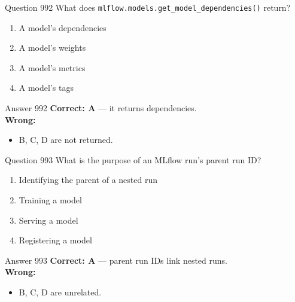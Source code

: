 \documentclass[aspectratio=169,11pt]{beamer}
\begin{document}
	\begin{frame}{Question 992}
		What does \texttt{mlflow.models.get\_model\_dependencies()} return?
		\begin{enumerate}[label=\Alph*.]
			\item A model's dependencies
			\item A model's weights
			\item A model's metrics
			\item A model's tags
		\end{enumerate}
	\end{frame}
	\begin{frame}{Answer 992}
		\textbf{Correct: A} --- it returns dependencies.\\
		\vspace{0.5em}
		\textbf{Wrong:}
		\begin{itemize}
			\item B, C, D are not returned.
		\end{itemize}
	\end{frame}
	
	\begin{frame}{Question 993}
		What is the purpose of an MLflow run's parent run ID?
		\begin{enumerate}[label=\Alph*.]
			\item Identifying the parent of a nested run
			\item Training a model
			\item Serving a model
			\item Registering a model
		\end{enumerate}
	\end{frame}
	\begin{frame}{Answer 993}
		\textbf{Correct: A} --- parent run IDs link nested runs.\\
		\vspace{0.5em}
		\textbf{Wrong:}
		\begin{itemize}
			\item B, C, D are unrelated.
		\end{itemize}
	\end{frame}
	
\end{document}
